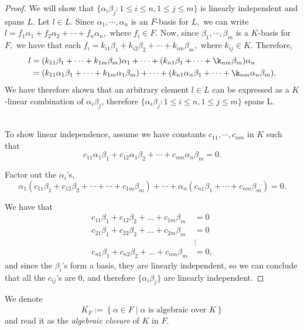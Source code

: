 \begin{proof}
    We will show that $\{\alpha_i\beta_j : 1\leq i\leq n, 1\leq j\leq m\}$ is linearly independent and spans $L.$ Let $l\in L$. Since $\alpha_1,\cdots, \alpha_n$ is an $F$-basis for $L,$ we can write $l=f_1\alpha_1+f_2\alpha_2+\cdots +f_n \alpha_n,$ where $f_i\in F.$ Now, since $\beta_1,\cdots,\beta_m$ is a $K$-basis for $F,$ we have that each $f_i=k_{i1}\beta_1+k_{i2}\beta_2+\cdots+k_{im}\beta_m,$ where $k_{ij}\in K.$ Therefore, 
    \begin{align*}
        l&=(k_{11}\beta_1+\cdots+k_{1m}\beta_m)\alpha_1+\cdots+(k_{n1}\beta_1+\cdots+\k_{nm}\beta_{m})\alpha_n
        \\ &= (k_{11}\alpha_1\beta_1+\cdots+k_{1m}\alpha_1\beta_m)+\cdots+(k_{n1}\alpha_n\beta_1+\cdots+\k_{nm}\alpha_n\beta_{m}).
    \end{align*}
    We have therefore shown that an arbitrary element $l\in L$ can be expressed as a $K$-linear combination of $\alpha_i\beta_j$, therefore $\{\alpha_i\beta_j : 1\leq i\leq n, 1\leq j\leq m\}$ spans L.

    \\To show linear independence, assume we have constants $c_{11}, \cdots, c_{nm}$ in $K$ such that
    $$c_{11} \alpha_1 \beta_1 + c_{12} \alpha_1 \beta_2 + \cdots + c_{nm} \alpha_n \beta_m = 0.$$
    
    Factor out the $\alpha_i$'s,
    $$\alpha_1 (c_{11} \beta_1 + c_{12} \beta_2 + \cdots+ \cdots + c_{1m} \beta_m) + \cdots + \alpha_n (c_{n1} \beta_1 + \cdots + c_{nm} \beta_m) = 0.$$

    We have that
    \begin{align*}
    c_{11} \beta_1 + c_{12} \beta_2 + \ldots + c_{1m} \beta_m &= 0 \\
    c_{21} \beta_1 + c_{22} \beta_2 + \ldots + c_{2m} \beta_m &= 0 \\
    &\vdots \\
    c_{n1} \beta_1 + c_{n2} \beta_2 + \ldots + c_{nm} \beta_m &= 0,
    \end{align*}
    and since the $\beta_i$'s form a basis, they are linearly independent, so we can conclude that all the $c_{ij}$'s are 0, and therefore $\{\alpha_i \beta_j\}$ are linearly independent.
\end{proof}

\begin{definition}
    We denote \[\overline{K_F} := \left\{ \alpha\in F \mid \alpha\text{ is algebraic over } K\right\}\] and read it as the \emph{algebraic closure} of $K$ in $F$.
\end{definition}

